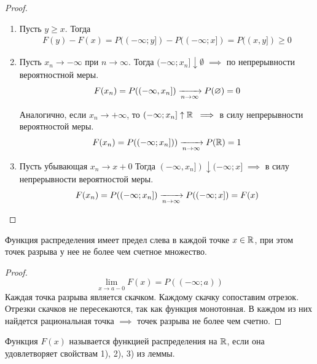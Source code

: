 \begin{proof}~

	\begin{enumerate}
		\item 
			Пусть $y \geq x$. Тогда
			\begin{align*}
				F(y) - F(x) = P((-\infty; y]) - P((-\infty; x]) = P((x, y]) \geq 0
			\end{align*}

		\item 
			Пусть $x_n \rightarrow -\infty$ при $n \rightarrow \infty$. 
			Тогда $(-\infty; x_n] \downarrow \emptyset\; \implies$ по непрерывности вероятностной меры.
			\begin{align*}
				F(x_n) = P((-\infty, x_n]) \xrightarrow[n \to \infty]{} P(\varnothing) = 0
			\end{align*}

			Аналогично, если $x_n \to +\infty$, то $(-\infty; x_n] \uparrow \mathbb{R}\; \implies$ 
			в силу непрерывности вероятностой меры.
			\begin{align*}
				F(x_n) = P((-\infty; x_n])) \xrightarrow[n \to \infty]{} P(\mathbb{R}) = 1
			\end{align*}

		\item 
			Пусть убывающая $x_n \to x + 0$ Тогда $(-\infty, x_n]) \downarrow (-\infty; x]\; \implies$ 
			в силу непрерывности вероятностой меры.
			\begin{align*}
				F(x_n) = P((-\infty; x_n]) \xrightarrow[n \to \infty]{} P((-\infty; x]) = F(x)
			\end{align*}
	\end{enumerate}
\end{proof}

\begin{corollary}
	Функция распределения имеет предел слева в каждой точке $x \in \mathbb{R}$, при этом точек разрыва у нее не более чем счетное множество.

	\begin{proof}
		$$\lim_{x \to a-0} F(x) = P((-\infty; a))$$
		Каждая точка разрыва является скачком. Каждому скачку сопоставим отрезок.
		Отрезки скачков не пересекаются, так как функция монотонная. 
		В каждом из них найдется рациональная точка $\implies$ точек разрыва не более чем счетно.
	\end{proof}
\end{corollary}

\begin{definition}
	Функция $F(x)$ называется функцией распределения на $\mathbb{R}$, если она удовлетворяет свойствам 
	1), 2), 3) из леммы.
\end{definition}

